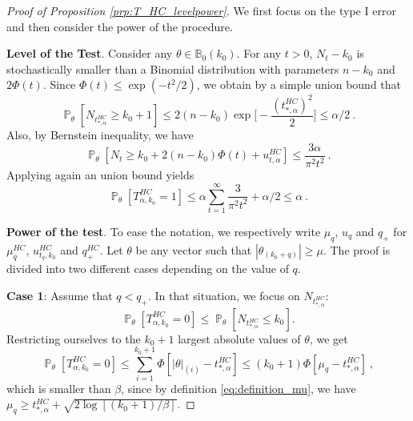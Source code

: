 \documentclass[twoside,11pt]{article}
\renewcommand{\P}{\operatorname{\mathbb{P}}}
\newcommand{\<}{\langle}
\renewcommand{\>}{\rangle}
\begin{document}
\begin{proof}[Proof of Proposition \ref{prp:T_HC_levelpower}]


We first focus on the type I error and then consider the power of the procedure.


\noindent
{\bf Level of the Test}.
Consider any $\theta\in \mathbb{B}_0(k_0)$. For any $t>0$,  $N_t-k_0$ is stochastically smaller than a Binomial distribution with parameters $n-k_0$ and $2\Phi(t)$. Since $\Phi(t)\leq \exp(-t^2/2)$, we obtain by a simple union bound that
\[
 \P_{\theta}[N_{t^{HC}_{*,\alpha}}\geq k_0+1]\leq 2(n-k_0)\exp\Big[-\frac{(t^{HC}_{*,\alpha})^2}{2}\Big]\leq \alpha /2\ .
\]
Also, by Bernstein inequality, we have
\[
 \P_{\theta}[N_t\geq k_0 +2(n-k_0)\Phi(t)+ u^{HC}_{t,\alpha}]\leq \frac{3\alpha}{\pi^2 t^2}\ .
\]
Applying again an union bound yields 
\[
 \P_{\theta}[T^{HC}_{\alpha,k_0}=1]\leq \alpha \sum_{t=1}^{\infty} \frac{3}{\pi^2 t^2 }+ \alpha/2\leq \alpha \ .
\]


\bigskip

\noindent 
  {\bf Power of the test}. To ease the notation, we respectively write $\mu_q$, $u_{q}$ and $q_+$ for $\mu^{HC}_{q}$, $u_{t_q,k_0}^{HC}$ and $q_+^{HC}$.
Let $\theta$ be any vector such that $|\theta_{(k_0+q)}|\geq \mu$.
The proof is divided into two different cases depending on the value of $q$.

\bigskip 

\noindent 
  {\bf Case 1}: Assume that  $q< q_+$. In that situation, we focus on $N_{t^{HC}_{*,\alpha}}$:
 \[
 \P_{\theta}[T^{HC}_{\alpha,k_0} = 0] \leq \P_{\theta}[N_{t^{HC}_{*,\alpha}}\leq k_0].
 \]
 Restricting ourselves to the $k_0+1$ largest absolute values of $\theta$, we get
 \[
 \P_{\theta}[T^{HC}_{\alpha,k_0} = 0] \leq \sum_{i=1}^{k_0+1} \Phi[|\theta|_{(i)}-t^{HC}_{*,\alpha}]\leq (k_0+1)\Phi[\mu_q-t^{HC}_{*,\alpha}]\ ,
 \]
 which is smaller than $\beta$, since by definition \eqref{eq:definition_mu}, we have $\mu_q\geq t^{HC}_{*,\alpha}+ \sqrt{2\log[(k_0+1)/\beta]}$.
 
 
 
 \bigskip 
 

\end{proof}
\end{document}
